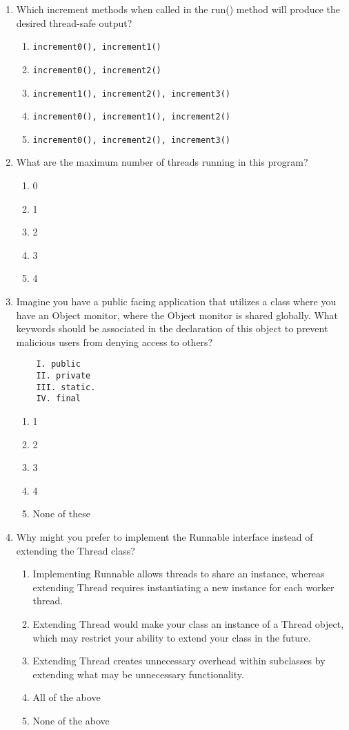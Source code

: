 \documentclass[S17-Final.tex]{subfiles}
\begin{document}
\begin{enumerate}
\item Which increment methods when called in the run() method will produce the desired thread-safe output?
	
\begin{enumerate}
\item  \texttt{increment0(), increment1()}
\item  \texttt{increment0(), increment2()}
\item  \texttt{increment1(), increment2(), increment3()}
\item  \texttt{increment0(), increment1(), increment2()} \ifdraft \Ans \fi
\item  \texttt{increment0(), increment2(), increment3()}
\end{enumerate}

\item What are the maximum number of threads running in this program?

\begin{enumerate}
\item  0
\item  1
\item  2
\item  3
\item  4 \ifdraft \Ans \fi 
\end{enumerate}
\clearpage
\item Imagine you have a public facing application that utilizes a class where you have an Object monitor, where the Object monitor is shared globally. What keywords should be associated in the declaration of this object to prevent malicious users from denying access to others?
\begin{lstlisting}
    I. public
    II. private
    III. static.
    IV. final
\end{lstlisting}
	
\begin{enumerate}
\item  1
\item  2
\item  3 \ifdraft \Ans \fi
\item  4
\item  None of these
\end{enumerate}

\item Why might you prefer to implement the Runnable interface instead of extending the Thread class?
	
\begin{enumerate}
\item  Implementing Runnable allows threads to share an instance, whereas extending Thread requires instantiating a new instance for each worker thread.
\item  Extending Thread would make your class an instance of a Thread object, which may restrict your ability to extend your class in the future.
\item  Extending Thread creates unnecessary overhead within subclasses by extending what may be unnecessary functionality.
\item  All of the above \ifdraft \Ans \fi 
\item  None of the above
\end{enumerate}


\end{enumerate}
\end{document}
